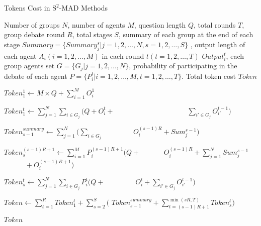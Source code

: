\begin{algorithm}[ht]
    \caption{Tokens Cost in \({\text{S}^2\text{-MAD}}\) Methods}
    \label{alg:token_cost_s^2_mad}
    \begin{algorithmic}[1]
        \Require Number of groups $N$, number of agents  $M$, question length $Q$, total rounds $T$, group debate round $R$, total stages $S$, summary of each group at the end of each stage $Summary = \{Summary_j^s|j=1,2, \ldots,N,s=1,2,\ldots,S\}$ , output length of each agent $A_i(i=1,2, \ldots,M)$ in each round $t(t=1,2,\ldots,T)$ $Output_i^t$,  each group agents set $G = \{G_j|j=1,2, \ldots,N\}$, probability of participating in the debate of each agent $P=\{P_i^t|i=1,2,\ldots,M,t=1,2,\ldots,T\}$.
        \Ensure Total token cost $Token$
        
        \State $Token_1^{1} \gets M \times Q + \sum_{i=1}^{M} O_i^1$ \\
        \Statex{} 
        
            \State $Token_1^t \gets \sum_{j=1}^{N} \sum_{i \in G_j} (Q  + O_i^{t}+$
            \Statex $\qquad \qquad \qquad \qquad \qquad \sum_{i' \in G_j} O_{i'}^{t-1})$ 
            \Statex {}
        \EndFor
        
            \State $Token_{s-1}^{summary} \gets \sum_{j=1}^{N} (\sum_{i \in G_j}$
            \Statex $\qquad \qquad O_i^{(s-1)R} + Sum_j^{s-1})$ 
            \Statex {}
            
            \State $Token_s^{(s-1)R+1} \gets \sum_{i=1}^{M} P_i^{(s-1)R+1}(Q+$
            \Statex $\qquad \quad O_i^{(s-1)R}+ \sum_{j=1}^{N} Sum_j^{s-1}$
            \Statex $\qquad \quad + O_i^{(s-1)R+1})$ 
            \Statex {}
        
                \State $Token_s^t \gets \sum_{j=1}^{N} \sum_{i \in G_j} P_i^t(Q  + $
                \Statex $\qquad \qquad O_i^{t} + \sum_{i' \in G_j} O_{i'}^{t-1})$ 
                \Statex {}
            \EndFor
        \EndFor
        
        \State $Token \gets  \sum_{t=1}^{R}Token_1^t+\sum_{s=2}^S($
        \Statex $Token_{s-1}^{summary}+\sum_{t=(s-1)R+1}^{\min(sR,T)}Token_s^t)$ 
        \Statex {}
        
        \State \Return $Token$
    \end{algorithmic}
\end{algorithm}

